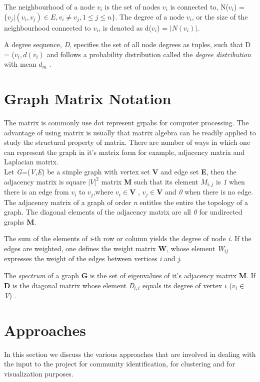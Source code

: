 The neighbourhood of a node $v_i$ is the set of
nodes $v_i$ is connected to, N($v_i$) = $\{v_j | (v_i, v_j) \in E, v_i \neq
v_j, 1 \leq j \leq n\}$. The degree of a node $v_i$, or the size of
the neighbourhood connected to $v_i$, is denoted as d($v_i$) =
$|N(v_i)|$. 
\par A degree sequence, \textit{D}, specifies the set of all node
degrees as tuples, such that D = {($v_i, d(v_i)$} and follows a
probability distribution called the \textit{degree distribution} with
mean $d_m$ \cite{githubtest1}.

\section{Graph Matrix Notation}
The matrix is commonly use dot represent grpahs for computer processing. The advantage of using matrix is usually that matrix algebra can be readily applied to study the structural property of matrix. There are number of ways in which one can represent the graph in it's matrix form for example, adjacency matrix and Laplacian matrix. 
\\
Let \textit{G}=(\textit{V},\textit{E}) be a simple graph with vertex set \textbf{V} and edge set \textbf{E}, then the adjacency matrix is square $|V|^2$ matrix \textbf{M} such that its element $M_{i,j}$ is \textit{1} when there is an edge from $v_i$ to $v_j$,where $v_i \in \textbf{V}$ , $ v_j \in \textbf{V}$ and \textit{0} when there is no edge.
The adjacency matrix of a graph of order \textit{n} entitles the entire the topology of a graph.  The diagonal elements of the adjacency matrix are all \textit{0} for undirected graphs \textbf{M}.

\par The sum of the elements of \textit{i}-th row or column yields the degree of node \textit{i}. If the edges are weighted, one defines the weight matrix \textbf{W}, whose element \textit{W}$_{ij}$ expresses the weight of the edges between vertices \textit{i} and \textit{j}.

\par The \textit{spectrum} of a graph \textbf{G} is the set of eigenvalues of it's adjacency matrix \textbf{M}. If \textbf{D}  is the diagonal matrix whose element \textit{D}$_{i,i}$ equals its degree of vertex $i$ ($v_i \in$ \textit{V}) \cite{matrep}.

\section{Approaches}
In this section we discuss the various approaches that are involved in dealing with the input to the project for community identification, for clustering and for visualization purposes. 
